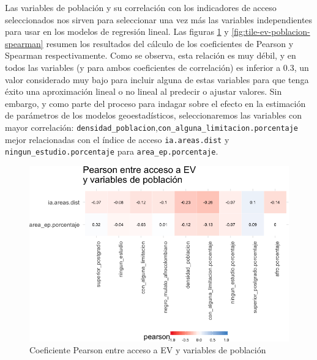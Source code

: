 \documentclass[12pt,]{book}
\begin{document}
Las variables de población y su correlación con los indicadores de
acceso seleccionados nos sirven para seleccionar una vez más las
variables independientes para usar en los modelos de regresión lineal.
Las figuras \ref{fig:tile-ev-poblacion-pearson} y
\ref{fig:tile-ev-poblacion-spearman} resumen los resultados del cálculo
de los coeficientes de Pearson y Spearman respectivamente. Como se
observa, esta relación es muy débil, y en todos las variables (y para
ambos coeficientes de correlación) es inferior a 0.3, un valor
considerado muy bajo para incluir alguna de estas variables para que
tenga éxito una aproximación lineal o no lineal al predecir o ajustar
valores. Sin embargo, y como parte del proceso para indagar sobre el
efecto en la estimación de parámetros de los modelos geoestadísticos,
seleccionaremos las variables con mayor correlación:
\texttt{densidad\_poblacion},\texttt{con\_alguna\_limitacion.porcentaje}
mejor relacionadas con el índice de acceso \texttt{ia.areas.dist} y
\texttt{ningun\_estudio.porcentaje} para \texttt{area\_ep.porcentaje}.

\begin{figure}
\includegraphics[width=1\linewidth]{tesis-unigis_files/figure-latex/tile-ev-poblacion-pearson-1} \caption{Coeficiente Pearson entre acceso a EV y variables de población}\label{fig:tile-ev-poblacion-pearson}
\end{figure}
\end{document}
